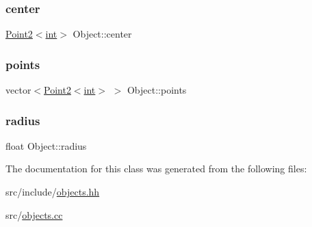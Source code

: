 \subsubsection{\texorpdfstring{center}{center}}
{\footnotesize\ttfamily \mbox{\hyperlink{class_point2}{Point2}}$<$\mbox{\hyperlink{draw_8hh_aa620a13339ac3a1177c86edc549fda9b}{int}}$>$ Object\+::center\hspace{0.3cm}{\ttfamily [protected]}}

\mbox{\label{class_object_aeb711bf0b9c9e157b436a177bd2a80e9}} 
\subsubsection{\texorpdfstring{points}{points}}
{\footnotesize\ttfamily vector$<$\mbox{\hyperlink{class_point2}{Point2}}$<$\mbox{\hyperlink{draw_8hh_aa620a13339ac3a1177c86edc549fda9b}{int}}$>$ $>$ Object\+::points\hspace{0.3cm}{\ttfamily [protected]}}

\mbox{\label{class_object_ab2985661849d90b81488e4b5e779b798}} 
\subsubsection{\texorpdfstring{radius}{radius}}
{\footnotesize\ttfamily float Object\+::radius\hspace{0.3cm}{\ttfamily [protected]}}



The documentation for this class was generated from the following files\+:\begin{DoxyCompactItemize}
\item 
src/include/\mbox{\hyperlink{objects_8hh}{objects.\+hh}}\item 
src/\mbox{\hyperlink{objects_8cc}{objects.\+cc}}\end{DoxyCompactItemize}
